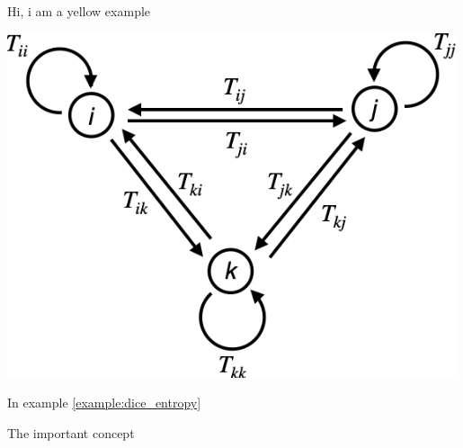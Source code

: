\begin{tcolorbox}[colback=yellow!10!white,colframe=red!50!black,fonttitle=\scshape,
  titlerule=0pt,
  title={\refstepcounter{exa}example~\theexa: Title of Example},
  title style={fill=yellow!10!white},
  coltitle=white, %
  drop shadow]
  Hi, i am a yellow example
  \begin{center}
    \centering
    \includegraphics[width=0.99\textwidth]{figures/graph.png}
    \label{example:dice_entropy}
  \end{center}
\end{tcolorbox}
In example \ref{example:dice_entropy}

\begin{thesisbox}{The important concept}
\blindtext
\end{thesisbox}
\blindtext
